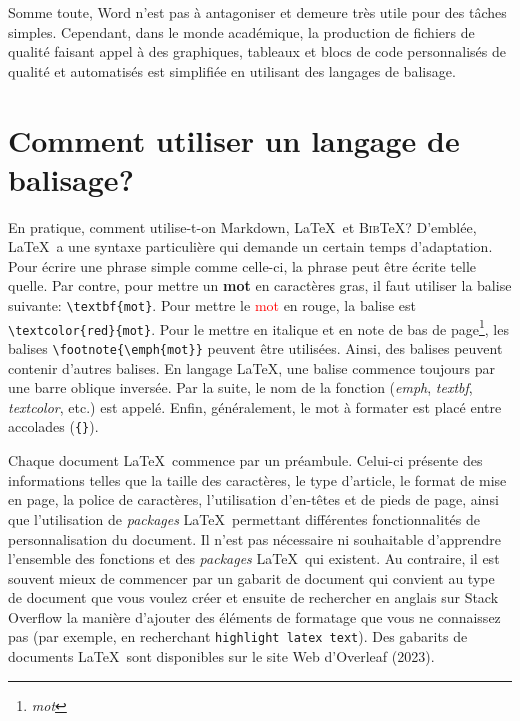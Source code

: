 \documentclass[
  letterpaper,
]{scrbook}
\begin{document}
Somme toute, Word n'est pas à antagoniser et demeure très utile pour des
tâches simples. Cependant, dans le monde académique, la production de
fichiers de qualité faisant appel à des graphiques, tableaux et blocs de
code personnalisés de qualité et automatisés est simplifiée en utilisant
des langages de balisage.

\hypertarget{comment-utiliser-un-langage-de-balisage}{%
\section{Comment utiliser un langage de
balisage?}\label{comment-utiliser-un-langage-de-balisage}}

En pratique, comment utilise-t-on Markdown, \LaTeX~et \textsc{Bib}\TeX?
D'emblée, \LaTeX~a une syntaxe particulière qui demande un certain temps
d'adaptation. Pour écrire une phrase simple comme celle-ci, la phrase
peut être écrite telle quelle. Par contre, pour mettre un \textbf{mot}
en caractères gras, il faut utiliser la balise suivante:
\texttt{\textbackslash{}textbf\{mot\}}. Pour mettre le
\textcolor{red}{mot} en rouge, la balise est
\texttt{\textbackslash{}textcolor\{red\}\{mot\}}. Pour le mettre en
italique et en note de bas de page\footnote{\emph{mot}}, les balises
\texttt{\textbackslash{}footnote\{\textbackslash{}emph\{mot\}\}} peuvent
être utilisées. Ainsi, des balises peuvent contenir d'autres balises. En
langage \LaTeX, une balise commence toujours par une barre oblique
inversée. Par la suite, le nom de la fonction (\emph{emph},
\emph{textbf}, \emph{textcolor}, etc.) est appelé. Enfin, généralement,
le mot à formater est placé entre accolades (\texttt{\{\}}).

Chaque document \LaTeX~commence par un préambule. Celui-ci présente des
informations telles que la taille des caractères, le type d'article, le
format de mise en page, la police de caractères, l'utilisation
d'en-têtes et de pieds de page, ainsi que l'utilisation de
\emph{packages} \LaTeX~permettant différentes fonctionnalités de
personnalisation du document. Il n'est pas nécessaire ni souhaitable
d'apprendre l'ensemble des fonctions et des \emph{packages} \LaTeX~qui
existent. Au contraire, il est souvent mieux de commencer par un gabarit
de document qui convient au type de document que vous voulez créer et
ensuite de rechercher en anglais sur Stack Overflow la manière d'ajouter
des éléments de formatage que vous ne connaissez pas (par exemple, en
recherchant \texttt{highlight\ latex\ text}). Des gabarits de documents
\LaTeX~sont disponibles sur le site Web d'Overleaf (2023).
\end{document}

